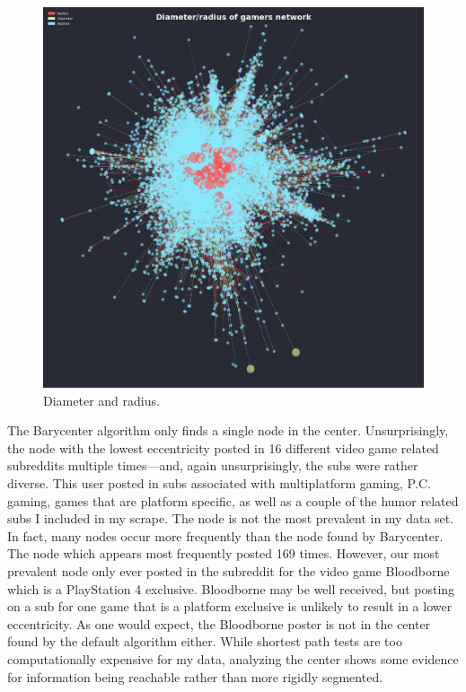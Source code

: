 \documentclass[12pt, a4paper]{article}
\begin{document}
\begin{figure}[ht!]
  \centering
  \includegraphics[width=\textwidth]{network_diarad.png}
  \caption{Diameter and radius.}
  \label{fig:diarad}
\end{figure}

The Barycenter algorithm only finds a single node in the center. Unsurprisingly, the node with the lowest eccentricity posted in 16 different video game related subreddits multiple times---and, again unsurprisingly, the subs were rather diverse. This user posted in subs associated with multiplatform gaming, P.C. gaming, games that are platform specific, as well as a couple of the humor related subs I included in my scrape. The node is not the most prevalent in my data set. In fact, many nodes occur more frequently than the node found by Barycenter. The node which appears most frequently posted 169 times. However, our most prevalent node only ever posted in the subreddit for the video game Bloodborne which is a PlayStation 4 exclusive. Bloodborne may be well received, but posting on a sub for one game that is a platform exclusive is unlikely to result in a lower eccentricity. As one would expect, the Bloodborne poster is not in the center found by the default algorithm either. While shortest path tests are too computationally expensive for my data, analyzing the center shows some evidence for information being reachable rather than more rigidly segmented.
\end{document}
